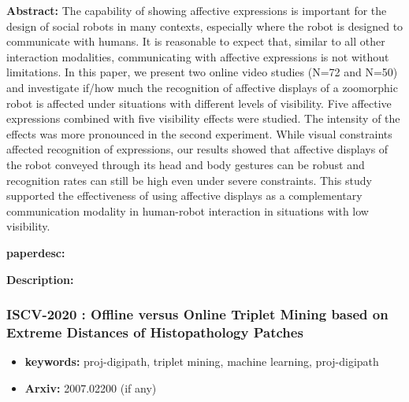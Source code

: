 \documentclass{article}
\begin{document}

\textbf{Abstract:} The capability of showing affective expressions is important for the design of social robots in many contexts, especially where the robot is designed to communicate with humans. It is reasonable to expect that, similar to all other interaction modalities, communicating with affective expressions is not without limitations. In this paper, we present two online video studies (N=72 and N=50) and investigate if/how much the recognition of affective displays of a zoomorphic robot is affected under situations with different levels of visibility. Five affective expressions combined with five visibility effects were studied. The intensity of the effects was more pronounced in the second experiment. While visual constraints affected recognition of expressions, our results showed that affective displays of the robot conveyed through its head and body gestures can be robust and recognition rates can still be high even under severe constraints. This study supported the effectiveness of using affective displays as a complementary communication modality in human-robot interaction in situations with low visibility.

\textbf{paperdesc:} 

\textbf{Description:} 



\newpage
\subsubsection{\textbf{ISCV-2020} : Offline versus Online Triplet Mining based on Extreme Distances of Histopathology Patches}
\begin{itemize}
\item \textbf{keywords:} proj-digipath, triplet mining, machine learning, proj-digipath
\item \textbf{Arxiv:} 2007.02200 (if any)
\end{itemize}
\end{document}

